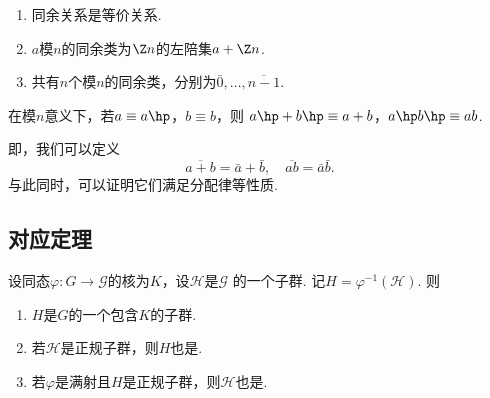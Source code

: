   \begin{pos}
    $\,$
    \begin{enumerate}
      \item 同余关系是等价关系.
      \item $a$模$n$的同余类为$\Z n$的左陪集$a+\Z n$.
      \item 共有$n$个模$n$的同余类，分别为$\bar{0},\dots,\overline{n-1}$.
    \end{enumerate}
  \end{pos}

  \begin{thm}
    在模$n$意义下，若$a\equiv a\hp$，$b\equiv b$，则
    $a\hp + b\hp \equiv a + b$，$a\hp b\hp \equiv ab$.
  \end{thm}
  \remark
    即，我们可以定义
    \[
      \overline{a+b} = \bar{a} + \bar{b},\quad
      \overline{ab}  = \bar{a}\bar{b}.
    \]
    与此同时，可以证明它们满足分配律等性质.

\subsection{对应定理}

  \begin{pos}
    \label{pos: 弱对应定理}
    设同态$\varphi:G\to\mathcal{G}$的核为$K$，设$\mathcal{H}$是$\mathcal{G}$
    的一个子群. 记$H=\varphi^{-1}(\mathcal{H})$. 则
    \begin{enumerate}
      \item $H$是$G$的一个包含$K$的子群.
      \item 若$\mathcal{H}$是正规子群，则$H$也是.
      \item 若$\varphi$是满射且$H$是正规子群，则$\mathcal{H}$也是.
    \end{enumerate}
  \end{pos}

